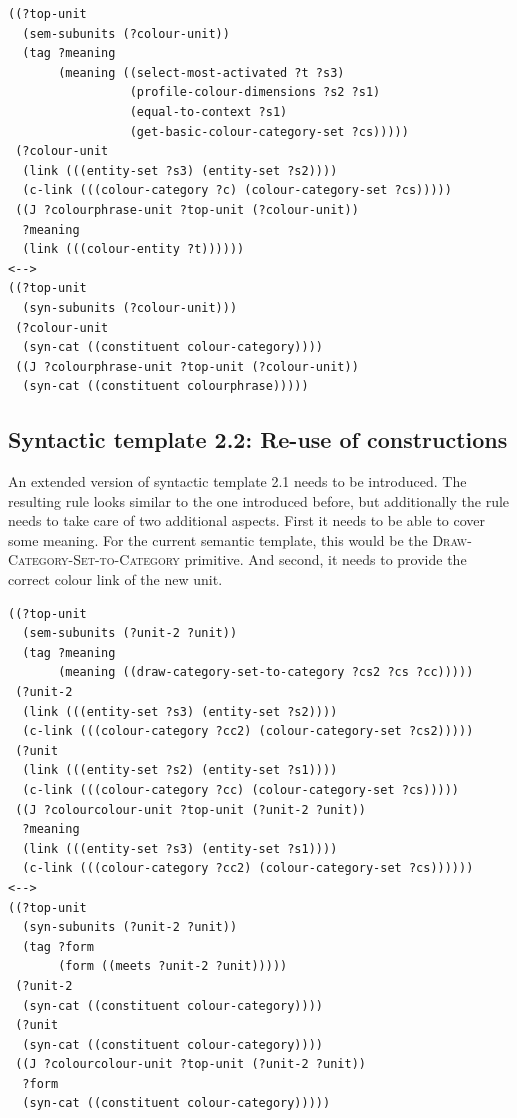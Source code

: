 \footnotesize
{}
\begin{lstlisting}
((?top-unit
  (sem-subunits (?colour-unit))
  (tag ?meaning
       (meaning ((select-most-activated ?t ?s3)
                 (profile-colour-dimensions ?s2 ?s1)
                 (equal-to-context ?s1)
                 (get-basic-colour-category-set ?cs)))))
 (?colour-unit
  (link (((entity-set ?s3) (entity-set ?s2))))
  (c-link (((colour-category ?c) (colour-category-set ?cs)))))
 ((J ?colourphrase-unit ?top-unit (?colour-unit))
  ?meaning
  (link (((colour-entity ?t))))))
<-->
((?top-unit 
  (syn-subunits (?colour-unit)))
 (?colour-unit 
  (syn-cat ((constituent colour-category))))
 ((J ?colourphrase-unit ?top-unit (?colour-unit))
  (syn-cat ((constituent colourphrase)))))
\end{lstlisting}
\normalsize

\subsection{Syntactic template 2.2: Re-use of constructions}

An extended version of syntactic template 2.1 needs to be
introduced. The resulting rule looks similar to the one introduced
before, but additionally the rule needs to take care of two
additional aspects. First it needs to be able to cover some
meaning. For the current semantic template, this would be the
\textsc{Draw-Category-Set-to-Category} primitive. And second, it needs
to provide the correct colour link of the new unit.

\footnotesize
{}
\begin{lstlisting}
((?top-unit
  (sem-subunits (?unit-2 ?unit))
  (tag ?meaning
       (meaning ((draw-category-set-to-category ?cs2 ?cs ?cc)))))
 (?unit-2
  (link (((entity-set ?s3) (entity-set ?s2))))
  (c-link (((colour-category ?cc2) (colour-category-set ?cs2)))))
 (?unit
  (link (((entity-set ?s2) (entity-set ?s1))))
  (c-link (((colour-category ?cc) (colour-category-set ?cs)))))
 ((J ?colourcolour-unit ?top-unit (?unit-2 ?unit))
  ?meaning
  (link (((entity-set ?s3) (entity-set ?s1))))
  (c-link (((colour-category ?cc2) (colour-category-set ?cs))))))
<-->
((?top-unit
  (syn-subunits (?unit-2 ?unit))
  (tag ?form 
       (form ((meets ?unit-2 ?unit)))))
 (?unit-2 
  (syn-cat ((constituent colour-category))))
 (?unit 
  (syn-cat ((constituent colour-category))))
 ((J ?colourcolour-unit ?top-unit (?unit-2 ?unit))
  ?form
  (syn-cat ((constituent colour-category)))))
\end{lstlisting}
\normalsize


